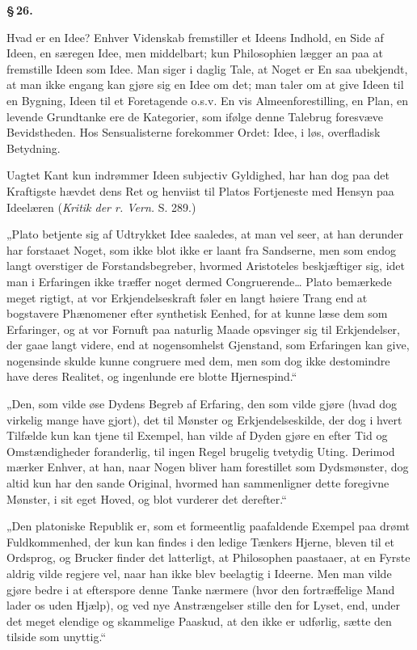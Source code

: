 \documentclass[12pt]{book}
\newcommand{\opage}[1]{\marginnote{\footnotesize\textit{[#1]}}}
\begin{document}
\begin{center}{\bfseries \S\,26.}\end{center}

Hvad er en Idee? Enhver Videnskab fremstiller et Ideens Indhold, en Side af Ideen, en
særegen Idee, men middelbart; kun Philosophien lægger an paa at fremstille Ideen som Idee.
Man siger i daglig Tale, at Noget er En saa ubekjendt, at man ikke engang kan gjøre sig en
Idee om det; man taler om at give Ideen til en Bygning, Ideen til et Foretagende o.s.v. En vis
Almeenforestilling, en Plan, en levende Grundtanke ere de Kategorier, som ifølge denne
Talebrug foresvæve Bevidstheden. Hos Sensualisterne forekommer Ordet: Idee, i løs,
overfladisk Betydning.

Uagtet Kant kun indrømmer Ideen subjectiv Gyldighed, har han dog paa det Kraftigste hævdet
dens Ret og henviist til Platos Fortjeneste med Hensyn paa Ideelæren (\textit{Kritik der r.
Vern.} S. 289.)

„Plato betjente sig af Udtrykket Idee saaledes, at man vel seer, at han derunder har forstaaet
Noget, som ikke blot ikke er laant fra Sandserne, men som endog langt overstiger de
Forstandsbegreber, hvormed Aristoteles beskjæftiger sig, idet man i Erfaringen ikke træffer
noget dermed Congruerende\ldots{} Plato bemærkede meget rigtigt, at vor Erkjendelseskraft føler
en langt høiere Trang end at bogstavere Phænomener efter synthetisk Eenhed, for at kunne læse
dem som Erfaringer, og at vor Fornuft paa naturlig Maade opsvinger sig til Erkjendelser, der
gaae langt videre, end at nogensomhelst Gjenstand, som Erfaringen kan give, nogensinde skulde
kunne congruere med dem, men som dog ikke destomindre have deres Realitet, og ingenlunde ere
blotte Hjernespind.“

\opage{119} „Den, som vilde øse Dydens Begreb af Erfaring, den som vilde gjøre (hvad dog virkelig mange
have gjort), det til Mønster og Erkjendelseskilde, der dog i hvert Tilfælde kun kan tjene til
Exempel, han vilde af Dyden gjøre en efter Tid og Omstændigheder foranderlig, til ingen Regel
brugelig tvetydig Uting. Derimod mærker Enhver, at han, naar Nogen bliver ham forestillet som
Dydsmønster, dog altid kun har den sande Original, hvormed han sammenligner dette foregivne
Mønster, i sit eget Hoved, og blot vurderer det derefter.“

„Den platoniske Republik er, som et formeentlig paafaldende Exempel paa drømt Fuldkommenhed,
der kun kan findes i den ledige Tænkers Hjerne, bleven til et Ordsprog, og Brucker finder det
latterligt, at Philosophen paastaaer, at en Fyrste aldrig vilde regjere vel, naar han ikke blev
beelagtig i Ideerne. Men man vilde gjøre bedre i at efterspore denne Tanke nærmere (hvor den
fortræffelige Mand lader os uden Hjælp), og ved nye Anstrængelser stille den for Lyset, end,
under det meget elendige og skammelige Paaskud, at den ikke er udførlig, sætte den tilside som
unyttig.“
\end{document}

